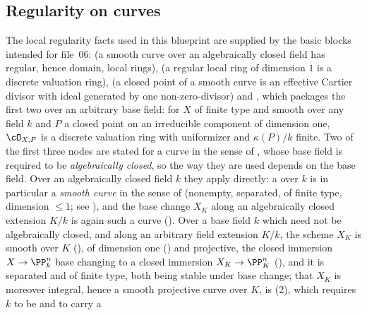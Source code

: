 \subsection{Regularity on curves}

\begin{remark}\label{rem:pc-regularity-sc}
The local regularity facts used in this blueprint are supplied by the
basic blocks intended for file~06:  (a smooth
curve over an algebraically closed field has regular, hence domain, local
rings),
 (a regular local ring of dimension $1$
is a discrete valuation ring),
 (a closed point of a smooth curve is an
effective Cartier divisor with ideal generated by one non-zero-divisor)
and , which packages the first two
over an arbitrary base field: for $X$ of finite type and smooth over any
field $k$ and $P$ a closed point on an irreducible component of
dimension one, $\cO_{X,P}$ is a discrete valuation ring with
uniformizer and $\kappa(P)/k$ finite.
Two of the first three nodes are stated for a curve in the sense of
, whose base field is required to be
\emph{algebraically closed}, so the way they are used depends on the
base field.  Over an algebraically closed field $k$ they apply directly:
a  over
$k$ is in particular a \emph{smooth curve} in the sense of
 (nonempty, separated, of finite type, dimension
$\le1$; see ), and the base change $X_K$ along
an algebraically closed extension $K/k$ is again such a curve
().  Over a base field $k$ which need
not be algebraically closed, and along an arbitrary field extension
$K/k$, the scheme $X_K$ is smooth over $K$
(), of dimension one
() and projective, the closed immersion
$X\to\PP^n_k$ base changing to a closed immersion $X_K\to\PP^n_K$
(), and it is separated and of
finite type, both being stable under base change; that $X_K$ is moreover
integral, hence a smooth projective curve over $K$, is
(2), which requires $k$ to be
 and to carry a

\end{remark}
